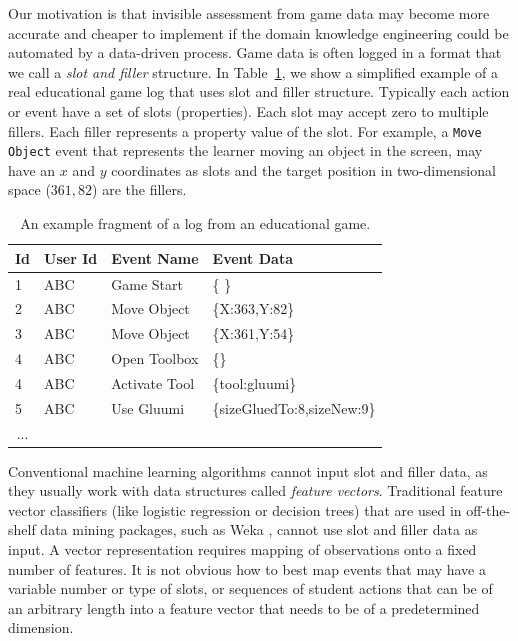 \documentclass{sigchi}
\begin{document}
Our motivation is that invisible assessment from game data may become more accurate and cheaper to implement if the domain knowledge engineering could be automated by a data-driven process.
Game data is often logged  in a format that we call a \textit{slot and filler} structure.
In Table~\ref{tbl:log_example}, we show a simplified example of a real educational game log that uses slot and filler structure.
Typically each action or event have a set of slots (properties).
Each slot may accept zero to multiple fillers. 
Each filler represents a property value of the slot.
For example, a \texttt{Move Object} event  that represents the learner moving an object in the screen, may have an $x$ and $y$ coordinates as slots and the target position in two-dimensional space ($361, 82$) are the fillers.

\begin{table}[tbh]
	\begin{tabular}{@{}llll@{}}
		\toprule
		\textbf{Id}             & \textbf{User Id} & \textbf{Event Name} & \textbf{Event Data}        \\ \midrule
		1                       & ABC              & Game Start          & \{ \}                        \\
		2                       & ABC              & Move Object         & \{X:363,Y:82\} \\
		3                       & ABC              & Move Object         & \{X:361,Y:54\} \\
		4                       & ABC              & Open Toolbox        & \{\}        \\
		4                       & ABC              & Activate Tool        & \{tool:gluumi\}        \\
		5                       & ABC              & Use Gluumi        & \{sizeGluedTo:8,sizeNew:9\} \\        
		\multicolumn{1}{c}{...} &                  &                     &                            \\ \bottomrule
	\end{tabular}
	\caption{An example fragment of a log from an educational game. \label{tbl:log_example}}
\end{table}


Conventional machine learning algorithms cannot input slot and filler data, as they  usually work with data structures called \textit{feature vectors}. 
Traditional feature vector classifiers (like logistic regression or decision trees)  that are used in off-the-shelf data mining packages, such as Weka \cite{hall2009weka}, cannot  use slot and filler data as input. 
A vector representation requires mapping of observations onto a fixed number of features.
It is not obvious how to best map events that may have a variable number or type of slots, or sequences of student actions that can be of an arbitrary length into a feature vector that needs to be of a predetermined dimension.
\end{document}
